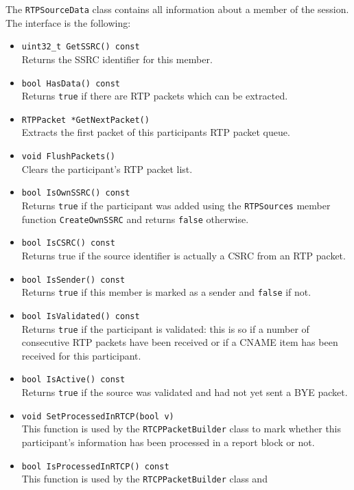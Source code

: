\documentclass[12pt,a4paper]{article}
\begin{document}
				The {\tt RTPSourceData} class contains all information about a member
				of the session. The interface is the following:
				\begin{itemize}
					\item {\tt uint32\_t GetSSRC() const}\\
						Returns the SSRC identifier for this member.
					\item {\tt bool HasData() const}\\
						Returns {\tt true} if there are RTP packets which can be extracted.
					\item {\tt RTPPacket *GetNextPacket()}\\
						Extracts the first packet of this participants RTP packet queue.
					\item {\tt void FlushPackets()}\\
						Clears the participant's RTP packet list.
					\item {\tt bool IsOwnSSRC() const}\\
						Returns {\tt true} if the participant was added using the
						{\tt RTPSources} member function {\tt CreateOwnSSRC} and
						returns {\tt false} otherwise.
					\item {\tt bool IsCSRC() const}\\
						Returns true if the source identifier is actually a CSRC from
						an RTP packet.
					\item {\tt bool IsSender() const}\\
						Returns {\tt true} if this member is marked as a sender and
						{\tt false} if not.
					\item {\tt bool IsValidated() const}\\
						Returns {\tt true} if the participant is validated: this is so
						if a number of consecutive RTP packets have been received or if
						a CNAME item has been received for this participant.
					\item {\tt bool IsActive() const}\\
						Returns {\tt true} if the source was validated and had not yet
						sent a BYE packet.
					\item {\tt void SetProcessedInRTCP(bool v)}\\
						This function is used by the {\tt RTCPPacketBuilder} class to mark
						whether this participant's information has been processed in a
						report block or not.
					\item {\tt bool IsProcessedInRTCP() const}\\
						This function is used by the {\tt RTCPPacketBuilder} class and

\end{itemize}
\end{document}
